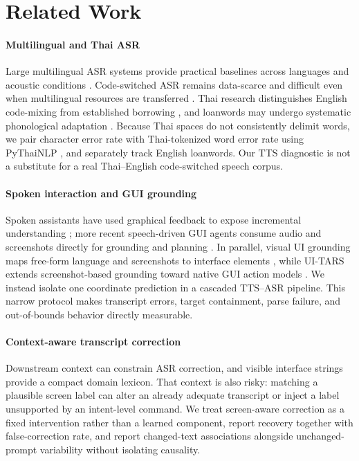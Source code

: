 \section{Related Work}
\IEEEpubidadjcol

\paragraph{Multilingual and Thai ASR}
Large multilingual ASR systems provide practical baselines across languages and acoustic conditions \cite{radford2023whisper,fasterwhisper}. Code-switched ASR remains data-scarce and difficult even when multilingual resources are transferred \cite{winata2020codeswitch}. Thai research distinguishes English code-mixing from established borrowing \cite{rungrojsuwan2023mixing}, and loanwords may undergo systematic phonological adaptation \cite{kenstowicz2006thai}. Because Thai spaces do not consistently delimit words, we pair character error rate with Thai-tokenized word error rate using PyThaiNLP \cite{pythainlp}, and separately track English loanwords. Our TTS diagnostic is not a substitute for a real Thai--English code-switched speech corpus.

\paragraph{Spoken interaction and GUI grounding}
Spoken assistants have used graphical feedback to expose incremental understanding \cite{kennington2016spoken}; more recent speech-driven GUI agents consume audio and screenshots directly for grounding and planning \cite{han2025guirobotron}. In parallel, visual UI grounding maps free-form language and screenshots to interface elements \cite{qian2024visual}, while UI-TARS extends screenshot-based grounding toward native GUI action models \cite{uitars}. We instead isolate one coordinate prediction in a cascaded TTS--ASR pipeline. This narrow protocol makes transcript errors, target containment, parse failure, and out-of-bounds behavior directly measurable.

\paragraph{Context-aware transcript correction}
Downstream context can constrain ASR correction, and visible interface strings provide a compact domain lexicon. That context is also risky: matching a plausible screen label can alter an already adequate transcript or inject a label unsupported by an intent-level command. We treat screen-aware correction as a fixed intervention rather than a learned component, report recovery together with false-correction rate, and report changed-text associations alongside unchanged-prompt variability without isolating causality.
